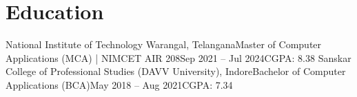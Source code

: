 \section{\textbf{Education}}
\resumeSubHeadingListStart
\resumeEdu
{National Institute of Technology Warangal, Telangana}{Master of Computer Applications (MCA) | NIMCET AIR 208}{Sep 2021 -- Jul 2024}{CGPA: 8.38}
\resumeEdu
{Sanskar College of Professional Studies (DAVV University), Indore}{Bachelor of Computer Applications (BCA)}{May 2018 -- Aug 2021}{CGPA: 7.34}
\resumeSubHeadingListEnd
